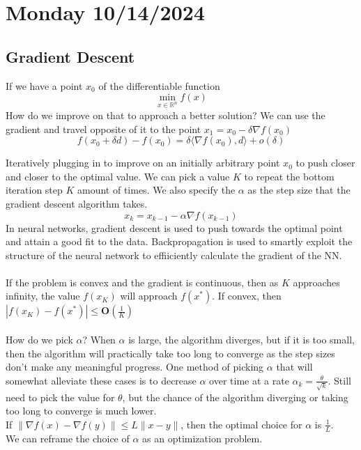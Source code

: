  \section{Monday 10/14/2024}
 \subsection{Gradient Descent}
 If we have a point $x_0$ of the differentiable function
 \begin{equation}
  \min_{x \in \mathbb{R}^n} f(x)
 \end{equation}
How do we improve on that to approach a better solution? We can use the gradient and travel opposite of it to the point $x_1 = x_0 - \delta \nabla f(x_0)$
\begin{equation}
  f(x_0 + \delta d) - f(x_0) = \delta \langle \nabla f(x_0), d \rangle + o(\delta)
\end{equation}

Iteratively plugging in to improve on an initially arbitrary point $x_0$ to push closer and closer to the optimal value. We can pick a value $K$ to repeat the bottom iteration step $K$ amount of times. We also specify the $\alpha$ as the step size that the gradient descent algorithm takes.
\begin{equation}
  x_k = x_{k-1} - \alpha \nabla f(x_{k-1})
\end{equation}
In neural networks, gradient descent is used to push towards the optimal point and attain a good fit to the data. Backpropagation is used to smartly exploit the structure of the neural network to effiiciently calculate the gradient of the NN. \\ \\
If the problem is convex and the gradient is continuous, then as $K$ approaches infinity, the value $f(x_K)$ will approach $f(x^*)$. If convex, then $|f(x_K) - f(x^*)| \leq \textbf{O}(\frac{1}{K})$ \\ \\
How do we pick $\alpha$? When $\alpha$ is large, the algorithm diverges, but if it is too small, then the algorithm will practically take too long to converge as the step sizes don't make any meaningful progress. One method of picking $\alpha$ that will somewhat alleviate these cases is to decrease $\alpha$ over time at a rate $\alpha_k = \frac{\theta}{\sqrt{k}}$. Still need to pick the value  for $\theta$, but the chance of the algorithm diverging or taking too long to converge is much lower. \\
If $\| \nabla f(x) - \nabla f(y) \| \leq L \| x - y \|$, then the optimal choice for $\alpha$ is $\frac{1}{L}$. \\
We can reframe the choice of $\alpha$ as an optimization problem.

